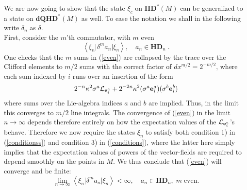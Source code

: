\documentclass[12pt]{article}
\def\d{\delta}
\def\cl{{\cal L}}
\begin{document}
We are now going to show that the state $\xi_c$ on $\mathbf{HD}^*(M)$ can be generalized to a state on $\mathbf{dQHD}^*(M)$ as well. To ease the notation we shall in the following write $\d_n$ as $\d$.\\

First, consider the $m$'th commutator, with $m$ even
\begin{equation}
\left\langle \xi_{n} \vert \d^m a_n \vert \xi_{n}\right\rangle ,\quad  a_n\in \mathbf{HD}_n\;.
\label{even}
\end{equation}
One checks that the $m$ sums in (\ref{even}) are collapsed by the trace over the Clifford elements to $m/2$ sums with the correct factor of $dx^{m/2}= 2^{-m/2}$, where each sum indexed by $i$ runs over an insertion of the form
\begin{equation}
2^{-n} \kappa^2 \sigma^a \cl_{{\bf e}_i^a} + 2^{-2n} \kappa^2  ( \sigma^a  {\bf e}^a_i)    ( \sigma^b  {\bf e}^b_i)  
\label{insertion}
\end{equation}
where sums over the Lie-algebra indices $a$ and $b$ are implied. Thus, in the limit this converges to $m/2$ line integrals. The convergence of (\ref{even}) in the limit $n\rightarrow\infty$ depends therefore entirely on how the expectation values of the $\cl_{{\bf e}_i^a}$'s behave. Therefore we now require the states $\xi_n$ to satisfy both condition 1) in (\ref{conditionss}) and condition 3) in (\ref{conditions}), where the latter here simply implies that the expectation values of powers of the vector-fields are required to depend smoothly on the points in $M$. We thus conclude that (\ref{even}) will converge and be finite:
\begin{equation}
\lim_{n\rightarrow\infty}\left\langle \xi_{n} \vert \d^m a_n \vert \xi_{n}\right\rangle < \infty ,\quad  a_n\in \mathbf{HD}_n, \; m \;\mbox{even}.
\label{even2}
\end{equation}
\end{document}
